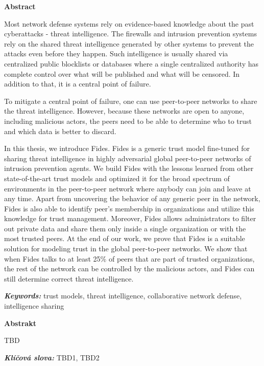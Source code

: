 \newenvironment{abstractpage}
  {\cleardoublepage\thispagestyle{empty}}
  {\vfill\cleardoublepage}
\newenvironment{abstract}[1]
  {\bigskip
   \begin{center}\bfseries#1\end{center}\small\leftskip=0.5cm\rightskip=0.5cm}
  {\par\bigskip}

\providecommand{\keywords}[2]{\footnotesize\textbf{\textit{#1:}} #2}

\begin{abstractpage}
\begin{abstract}{Abstract}

Most network defense systems rely on evidence-based knowledge about the past cyberattacks - threat intelligence. The firewalls and intrusion prevention systems rely on the shared threat intelligence generated by other systems to prevent the attacks even before they happen.
Such intelligence is usually shared via centralized public blocklists or databases where a single centralized authority has complete control over what will be published and what will be censored. In addition to that, it is a central point of failure.

To mitigate a central point of failure, one can use peer-to-peer networks to share the threat intelligence. However, because these networks are open to anyone, including malicious actors, the peers need to be able to determine who to trust and which data is better to discard.

In this thesis, we introduce Fides. Fides is a generic trust model fine-tuned for sharing threat intelligence in highly adversarial global peer-to-peer networks of intrusion prevention agents.
We build Fides with the lessons learned from other state-of-the-art trust models and optimized it for the broad spectrum of environments in the peer-to-peer network where anybody can join and leave at any time.
Apart from uncovering the behavior of any generic peer in the network, Fides is also able to identify peer's membership in organizations and utilize this knowledge for trust management.
Moreover, Fides allows administrators to filter out private data and share them only inside a single organization or with the most trusted peers. 
At the end of our work, we prove that Fides is a suitable solution for modeling trust in the global peer-to-peer networks. We show that when Fides talks to at least 25\% of peers that are part of trusted organizations, the rest of the network can be controlled by the malicious actors, and Fides can still determine correct threat intelligence.

\end{abstract}

\keywords{Keywords}{trust models, threat intelligence, collaborative network defense, intelligence sharing}

\vspace*{\fill}

\newpage
\begin{abstract}{Abstrakt}
    TBD 
    
\end{abstract}
\keywords{Klíčová slova}{TBD1, TBD2} 

\end{abstractpage}
\thispagestyle{empty}

\cleardoublepage